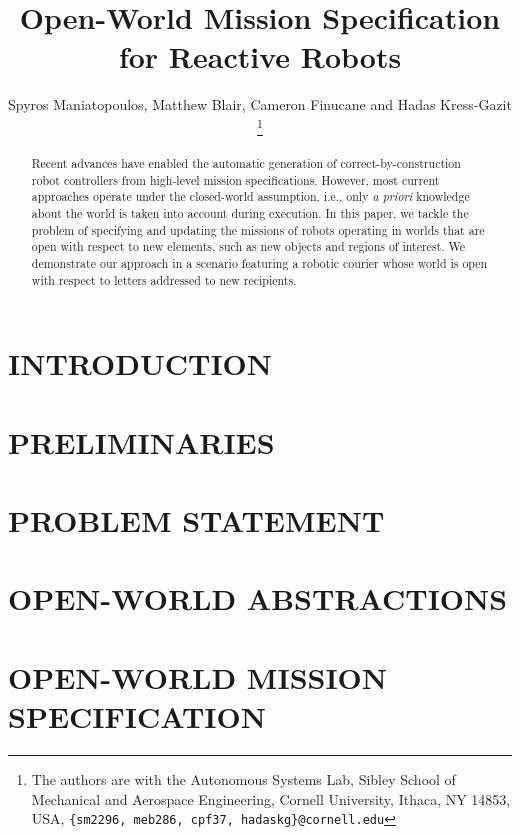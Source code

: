 \documentclass[letterpaper, 10 pt, conference]{ieeeconf}  %
\title{\LARGE \bf
	Open-World Mission Specification for Reactive Robots
}
\author{Spyros Maniatopoulos, Matthew Blair, Cameron Finucane and Hadas Kress-Gazit%
\thanks{The authors are with the Autonomous Systems Lab, Sibley School of Mechanical and Aerospace Engineering, Cornell University, Ithaca, NY 14853, USA, {\tt \{sm2296, meb286, cpf37, hadaskg\}\nolinkurl{@cornell.edu}}}%
}
\begin{document}
%
\maketitle
\thispagestyle{empty}
\pagestyle{empty}
%
\begin{abstract}

Recent advances have enabled the automatic generation of correct-by-construction robot controllers from high-level mission specifications. 
However, most current approaches operate under the closed-world assumption, i.e., only \emph{a priori} knowledge about the world is taken into account during execution. 
In this paper, we tackle the problem of specifying and updating the missions of robots operating in worlds that are open with respect to new elements, such as new objects and regions of interest.
We demonstrate our approach in a scenario featuring a robotic courier whose world is open with respect to letters addressed to new recipients.

\end{abstract}
%
%
\section{INTRODUCTION}

%
\section{PRELIMINARIES}\label{preliminaries}

%
\section{PROBLEM STATEMENT}\label{problem}

%
\section{OPEN-WORLD ABSTRACTIONS}\label{abstractions}

%
\section{OPEN-WORLD MISSION SPECIFICATION}\label{openworld}

%
\end{document}

